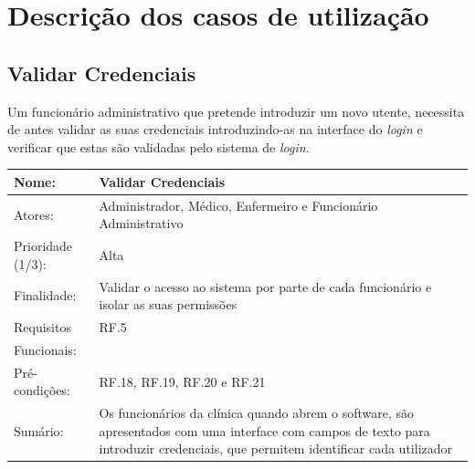 \documentclass[11pt,a4paper,twoside]{report}
\begin{document}
\section{Descrição dos casos de utilização }

\subsection{Validar Credenciais }

Um funcionário administrativo que pretende introduzir um novo utente, necessita de antes validar as suas credenciais introduzindo-as na interface do \textit{login} e verificar que estas são validadas pelo sistema de \textit{login}. 

\begin{center}
	\begin{tabularx}{\textwidth}{|lX|}
	\hline
	\textbf{Nome}: & \textbf{Validar Credenciais} \\ \hline
	Atores: & Administrador, Médico, Enfermeiro e Funcionário Administrativo \\ \hline
	Prioridade (1/3): & Alta \\ \hline
	Finalidade: & Validar o acesso ao sistema por parte de cada funcionário e isolar as suas permissões\\ \hline
	Requisitos & RF.5 \\
	Funcionais: & \\
	Pré-condições: & RF.18, RF.19, RF.20 e RF.21 \\
	Sumário: & Os funcionários da clínica quando abrem o software, são apresentados com uma interface com campos de texto para introduzir credenciais, que permitem identificar cada utilizador  \\
	\hline
\end{tabularx}


\end{center}
\end{document}

